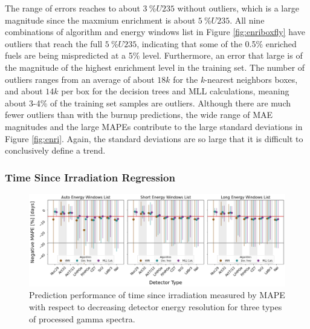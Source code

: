 The range of errors reaches to about $3\:\%U235$ without outliers, which is a
large magnitude since the maxmium enrichment is about $5\:\%U235$. All nine
combinations of algorithm and energy windows list in Figure
\ref{fig:enriboxfly} have outliers that reach the full $5\:\%U235$, indicating
that some of the 0.5\% enriched fuels are being mispredicted at a 5\% level.
Furthermore, an error that large is of the magnitude of the highest enrichment
level in the training set.  The number of outliers ranges from an average of
about $18k$ for the \textit{k}-nearest neighbors boxes, and about $14k$ per box
for the decision trees and \gls{MLL} calculations, meaning about 3-4\% of the
training set samples are outliers.  Although there are much fewer outliers than
with the burnup predictions, the wide range of \gls{MAE} magnitudes and the
large \gls{MAPE}s contribute to the large standard deviations in Figure
\ref{fig:enri}. Again, the standard deviations are so large that it is
difficult to conclusively define a trend.

\subsubsection{Time Since Irradiation Regression}

\begin{figure}[!htb]
  \centering
  \includegraphics[width=\textwidth]{./chapters/exp2/detector_preds_wrt_enlist_MAPE_cool.png}
  \caption{Prediction performance of time since irradiation measured by 
           \gls{MAPE} with respect to decreasing detector energy resolution 
           for three types of processed gamma spectra.}
  \label{fig:cool}
\end{figure}

